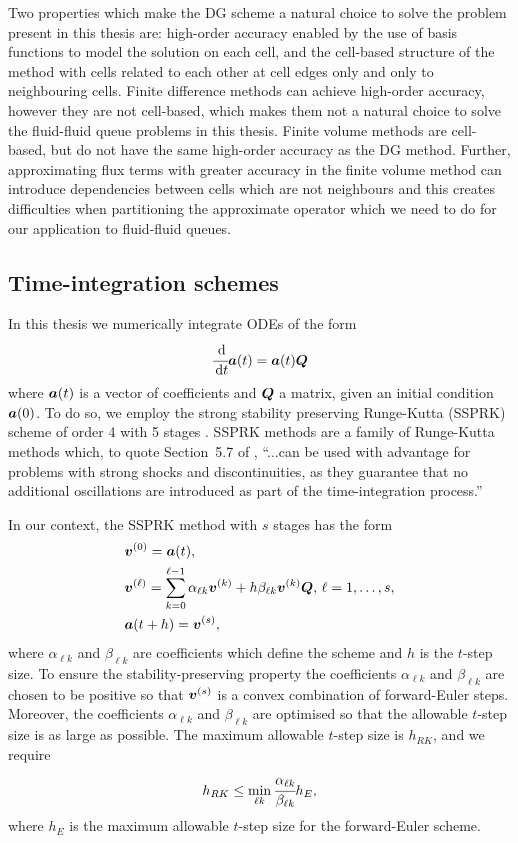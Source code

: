 Two properties which make the DG scheme a natural choice to solve the problem present in this thesis are: high-order accuracy enabled by the use of basis functions to model the solution on each cell, and the cell-based structure of the method with cells related to each other at cell edges only and only to neighbouring cells. Finite difference methods can achieve high-order accuracy, however they are not cell-based, which makes them not a natural choice to solve the fluid-fluid queue problems in this thesis. Finite volume methods are cell-based, but do not have the same high-order accuracy as the DG method. Further, approximating flux terms with greater accuracy in the finite volume method can introduce dependencies between cells which are not neighbours and this creates difficulties when partitioning the approximate operator which we need to do for our application to fluid-fluid queues. 

\subsection{Time-integration schemes}\label{sec: time integration}
In this thesis we numerically integrate ODEs of the form
\begin{align}\label{eqn: DG ODE w BCs 3}
	\cfrac{\, \mathrm{d}}{\, \mathrm{d} t} \boldsymbol a(t)
	= \boldsymbol a(t) \boldsymbol Q
\end{align}
where \(\boldsymbol a(t)\) is a vector of coefficients and \(\boldsymbol Q\) a matrix, given an initial condition \(\boldsymbol a(0)\). To do so, we employ the strong stability preserving Runge-Kutta (SSPRK) scheme of order 4 with 5 stages \citep{sr2002}. SSPRK methods are a family of Runge-Kutta methods which, to quote Section~5.7 of \cite{nodalDGBook}, ``...can be used with advantage for problems with strong shocks and discontinuities, as they guarantee that no additional oscillations are introduced as part of the time-integration process.'' 

In our context, the SSPRK method with \(s\) stages has the form 
\begin{align*}
	&\boldsymbol v^{(0)} = \boldsymbol a(t),\\
	&\boldsymbol v^{(\ell)} = \sum_{k=0}^{\ell-1} \alpha_{\ell k}\boldsymbol v^{(k)} + h\beta_{\ell k}  \boldsymbol v^{(k)}\boldsymbol Q,\, \ell = 1,\dots,s,\\
	&\boldsymbol a(t+h) =\boldsymbol v^{(s)},
\end{align*}
where \(\alpha_{\ell k}\) and \(\beta_{\ell k}\) are coefficients which define the scheme and \(h\) is the \(t\)-step size. To ensure the stability-preserving property the coefficients \(\alpha_{\ell k}\) and \(\beta_{\ell k}\) are chosen to be positive so that \(\boldsymbol v^{(s)}\) is a convex combination of forward-Euler steps. Moreover, the coefficients \(\alpha_{\ell k}\) and \(\beta_{\ell k}\) are optimised so that the allowable \(t\)-step size is as large as possible. The maximum allowable \(t\)-step size is \(h_{RK}\), and we require 
\[h_{RK} \leq \min_{\ell k}\cfrac{\alpha_{\ell k}}{\beta_{\ell k}}h_E,\]
where \(h_E\) is the maximum allowable \(t\)-step size for the forward-Euler scheme. 

